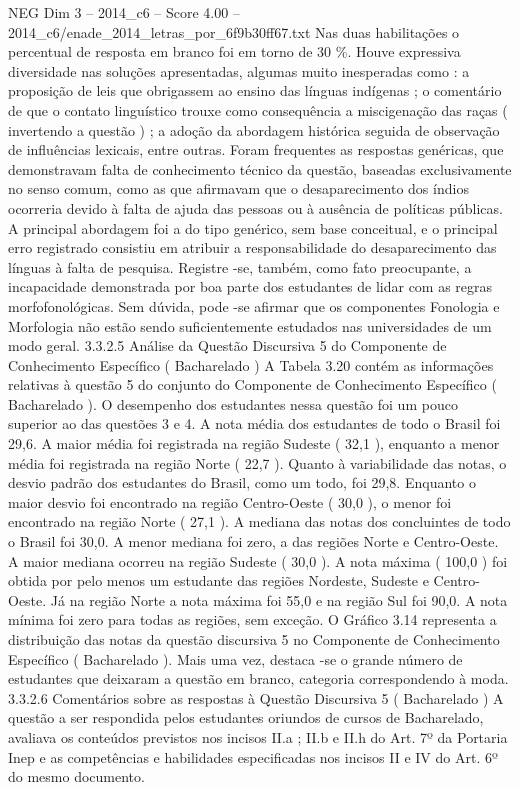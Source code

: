 \begin{textsample}{NEG Dim 3 – 2014\_c6 – Score 4.00 – 2014\_c6/enade\_2014\_letras\_por\_6f9b30ff67.txt}
Nas duas habilitações o percentual de resposta em branco foi em torno de 30 \%.
Houve expressiva diversidade nas soluções apresentadas, algumas muito inesperadas como : a proposição de leis que obrigassem ao ensino das línguas indígenas ; o comentário de que o contato linguístico trouxe como consequência a miscigenação das raças ( invertendo a questão ) ; a adoção da abordagem histórica seguida de observação de influências lexicais, entre outras.
Foram frequentes as respostas genéricas, que demonstravam falta de conhecimento técnico da questão, baseadas exclusivamente no senso comum, como as que afirmavam que o desaparecimento dos índios ocorreria devido à falta de ajuda das pessoas ou à ausência de políticas públicas.
A principal abordagem foi a do tipo genérico, sem base conceitual, e o principal erro registrado consistiu em atribuir a responsabilidade do desaparecimento das línguas à falta de pesquisa.
Registre -se, também, como fato preocupante, a incapacidade demonstrada por boa parte dos estudantes de lidar com as regras morfofonológicas.
Sem dúvida, pode -se afirmar que os componentes Fonologia e Morfologia não estão sendo suficientemente estudados nas universidades de um modo geral. 3.3.2.5 Análise da Questão Discursiva 5 do Componente de Conhecimento Específico ( Bacharelado ) A Tabela 3.20 contém as informações relativas à questão 5 do conjunto do Componente de Conhecimento Específico ( Bacharelado ).
O desempenho dos estudantes nessa questão foi um pouco superior ao das questões 3 e 4.
A nota média dos estudantes de todo o Brasil foi 29,6.
A maior média foi registrada na região Sudeste ( 32,1 ), enquanto a menor média foi registrada na região Norte ( 22,7 ).
Quanto à variabilidade das notas, o desvio padrão dos estudantes do Brasil, como um todo, foi 29,8.
Enquanto o maior desvio foi encontrado na região Centro-Oeste ( 30,0 ), o menor foi encontrado na região Norte ( 27,1 ).
A mediana das notas dos concluintes de todo o Brasil foi 30,0.
A menor mediana foi zero, a das regiões Norte e Centro-Oeste.
A maior mediana ocorreu na região Sudeste ( 30,0 ).
A nota máxima ( 100,0 ) foi obtida por pelo menos um estudante das regiões Nordeste, Sudeste e Centro-Oeste.
Já na região Norte a nota máxima foi 55,0 e na região Sul foi 90,0.
A nota mínima foi zero para todas as regiões, sem exceção.
O Gráfico 3.14 representa a distribuição das notas da questão discursiva 5 no Componente de Conhecimento Específico ( Bacharelado ).
Mais uma vez, destaca -se o grande número de estudantes que deixaram a questão em branco, categoria correspondendo à moda. 3.3.2.6 Comentários sobre as respostas à Questão Discursiva 5 ( Bacharelado ) A questão a ser respondida pelos estudantes oriundos de cursos de Bacharelado, avaliava os conteúdos previstos nos incisos II.a ; II.b e II.h do Art. 7º da Portaria Inep e as competências e habilidades especificadas nos incisos II e IV do Art. 6º do mesmo documento.

\end{textsample}
